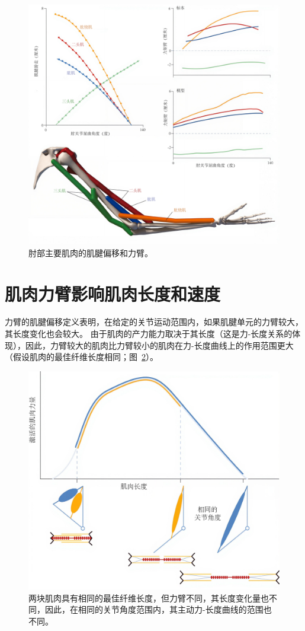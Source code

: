 \begin{figure}[!htb]
	\centering
	\includegraphics[width=1.0\linewidth]{chap6/6_6}
	\caption{肘部主要肌肉的肌腱偏移和力臂\cite{murray1995variation}。 \label{fig:6_6}}
\end{figure}


\section{肌肉力臂影响肌肉长度和速度}

力臂的肌腱偏移定义表明，在给定的关节运动范围内，如果肌腱单元的力臂较大，其长度变化也会较大。
由于肌肉的产力能力取决于其长度（这是力-长度关系的体现），因此，力臂较大的肌肉比力臂较小的肌肉在力-长度曲线上的作用范围更大（假设肌肉的最佳纤维长度相同；图~\ref{fig:6_7}）。

\begin{figure}[!htb]
	\centering
	\includegraphics[width=0.7\linewidth]{chap6/6_7}
	\caption{两块肌肉具有相同的最佳纤维长度，但力臂不同，其长度变化量也不同，因此，在相同的关节角度范围内，其主动力-长度曲线的范围也不同。 \label{fig:6_7}}
\end{figure}


